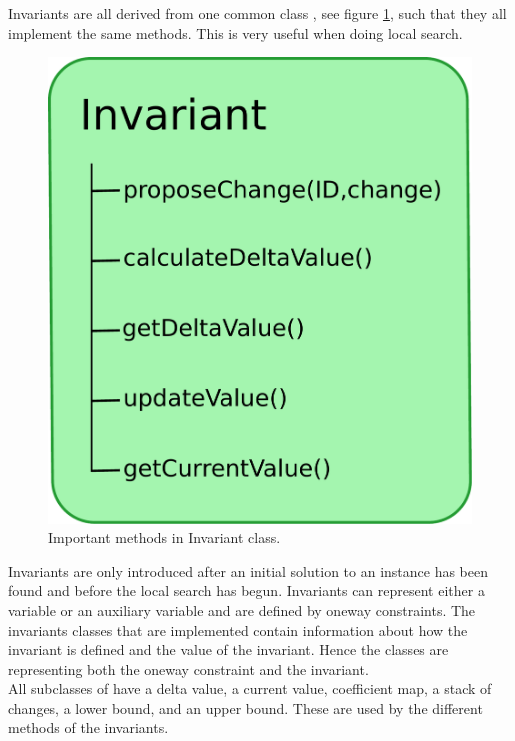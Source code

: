 Invariants are all derived from one common class , see figure \ref{fig_invariant}, such that they 
all implement the same methods. This is very useful when doing local search. 
\begin{figure}[!b]
\begin{center}
 \includegraphics[width=\linewidth/2]{invariant.pdf} \caption{Important methods in Invariant 
class.}\label{fig_invariant}
\end{center} 
\end{figure}
Invariants are only introduced after an initial solution to an instance has been found and before the local 
search has begun. Invariants can represent either a variable or an auxiliary variable and are defined by oneway 
constraints. The invariants classes that are implemented contain information about how the invariant is defined and the 
value of the invariant. Hence the  classes are representing both the oneway constraint and the 
invariant. \\ 
All subclasses of  have a delta value, a current value, coefficient map, a stack of changes, a lower 
bound, and an upper bound. These are used by the different methods of the invariants. \\

